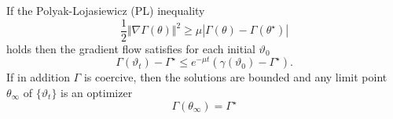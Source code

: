 \begin{theorem}\label{thm:31}
    If the Polyak-Lojasiewicz %
    (PL) inequality 
    \begin{equation}\label{eq:PL}
        \frac{1}{2}\Vert \nabla\Gamma (\theta)\Vert^2\geq \mu |\Gamma(\theta)-\Gamma(\theta^\star)|  
    \end{equation}
    holds then the gradient flow satisfies for each initial \(\vartheta_0\) 
    \[\Gamma(\vartheta_t)-\Gamma^\star\leq e^{-\mu t}(\gamma(\vartheta_0)-\Gamma^\star).\]
    If in addition \(\Gamma\) is coercive, then the solutions are bounded and 
    any limit point \(\theta_\infty\) of \(\{\vartheta_t\}\) is an optimizer 
    \[\Gamma(\theta_\infty)=\Gamma^\star\]
\end{theorem}

